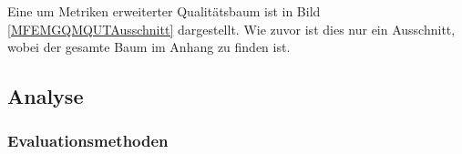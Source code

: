 Eine um Metriken erweiterter Qualitätsbaum ist in Bild \ref{MFEMGQMQUTAusschnitt} dargestellt. Wie zuvor ist dies nur ein Ausschnitt, wobei der gesamte Baum im Anhang zu finden ist.


\pagebreak
\subsection{Analyse}

\subsubsection{Evaluationsmethoden}





\pagebreak
